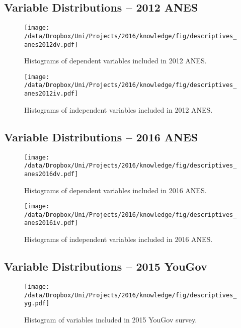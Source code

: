 \clearpage
\subsection{Variable Distributions -- 2012 ANES}
\begin{figure}[h]\centering
\texttt{[image: /data/Dropbox/Uni/Projects/2016/knowledge/fig/descriptives\_anes2012dv.pdf]}
\caption[Histograms of dependent variables included in 2012 ANES]{Histograms of dependent variables included in 2012 ANES.}\label{fig:descriptives_anes2012dv}
\end{figure}

\begin{figure}[h]\centering
\texttt{[image: /data/Dropbox/Uni/Projects/2016/knowledge/fig/descriptives\_anes2012iv.pdf]}
\caption[Histograms of independent variables included in 2012 ANES]{Histograms of independent variables included in 2012 ANES.}\label{fig:descriptives_anes2012iv}
\end{figure}

\clearpage
\subsection{Variable Distributions -- 2016 ANES}
\begin{figure}[h]\centering
\texttt{[image: /data/Dropbox/Uni/Projects/2016/knowledge/fig/descriptives\_anes2016dv.pdf]}
\caption[Histograms of dependent variables included in 2016 ANES]{Histograms of dependent variables included in 2016 ANES.}\label{fig:descriptives_anes2016dv}
\end{figure}

\begin{figure}[h]\centering
\texttt{[image: /data/Dropbox/Uni/Projects/2016/knowledge/fig/descriptives\_anes2016iv.pdf]}
\caption[Histograms of independent variables included in 2016 ANES]{Histograms of independent variables included in 2016 ANES.}\label{fig:descriptives_anes2016iv}
\end{figure}

\clearpage
\subsection{Variable Distributions -- 2015 YouGov}

\begin{figure}[h]\centering
\texttt{[image: /data/Dropbox/Uni/Projects/2016/knowledge/fig/descriptives\_yg.pdf]}
\caption[Histogram of variables included in 2015 YouGov survey]{Histogram of variables included in 2015 YouGov survey.}\label{fig:descriptives_yg}
\end{figure}


